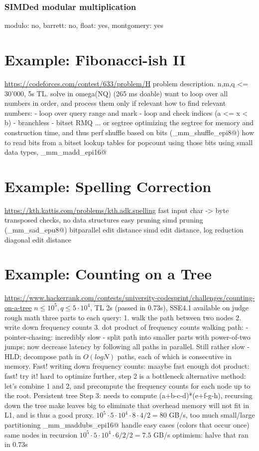 \documentclass[openany]{book}
\begin{document}
\subsection*{SIMDed modular multiplication}

modulo: no, barrett: no, float: yes, montgomery: yes

\chapter{Example: Fibonacci-ish II}
\url{https://codeforces.com/contest/633/problem/H}
problem description. n,m,q <= 30'000, 5s TL. solve in omega(NQ) (265 ms doable)
want to loop over all numbers in order, and process them only if relevant
how to find relevant numbers:
- loop over query range and mark
- loop and check indices (a <= x < b)
- branchless
- bitset RMQ ... or segtree
optimizing the segtree for memory and construction time, and thus perf
shuffle based on bits (\verb@_mm_shuffle_epi8@)
how to read bits from a bitset
lookup tables for popcount using those bits
using small data types, \verb@_mm_madd_epi16@

\chapter{Example: Spelling Correction}
\url{https://kth.kattis.com/problems/kth.adk.spelling}
fast input
char -> byte
transposed checks, no data structures
easy pruning
simd pruning (\verb@_mm_sad_epu8@)
bitparallel edit distance
simd edit distance, log reduction
diagonal edit distance

\chapter{Example: Counting on a Tree}
\url{https://www.hackerrank.com/contests/university-codesprint/challenges/counting-on-a-tree}
$n \le 10^5, q \le 5\cdot 10^4$, TL 2s (passed in 0.73s), SSE4.1 available on judge
rough math
three parts to each query:
1. walk the path between two nodes
2. write down frequency counts
3. dot product of frequency counts
walking path:
- pointer-chasing: incredibly slow
- split path into smaller parts with power-of-two jumps; now decrease latency by following all paths in parallel. Still rather slow
- HLD; decompose path in $O(log N)$ paths, each of which is consecutive in memory. Fast!
writing down frequency counts: maaybe fast enough
dot product: fast!
try it! hard to optimize further, step 2 is a bottleneck
alternative method: let's combine 1 and 2, and precompute the frequency counts for each node up to the root. Persistent tree
Step 3: needs to compute (a+b-c-d)*(e+f-g-h), recursing down the tree
make leaves big to eliminate that overhead
memory will not fit in L1, and is thus a good proxy. $10^5 \cdot 5\cdot 10^4 \cdot 8 \cdot 4 / 2 = 80$ GB/s, too much
small/large partitioning
\verb@_mm_maddubs_epi16@
handle easy cases (colors that occur once)
same nodes in recursion
$10^5 \cdot 5\cdot 10^4 \cdot 6 / 2 / 2 = 7.5$ GB/s
optimism: halve that
ran in 0.73s
\end{document}
